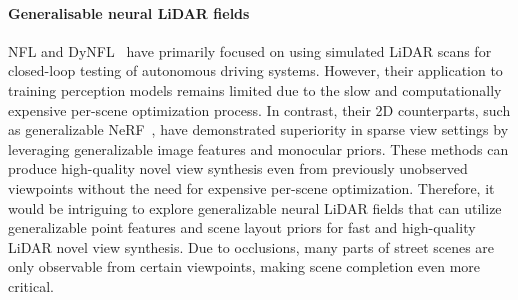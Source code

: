 \paragraph{Generalisable neural LiDAR fields}
NFL and DyNFL~\cite{Huang2023nfl,Wu2023dynfl} have primarily focused on using simulated LiDAR scans for closed-loop testing of autonomous driving systems. However, their application to training perception models remains limited due to the slow and computationally expensive per-scene optimization process. In contrast, their 2D counterparts, such as generalizable NeRF~\cite{yu2021pixelnerf,chen2021mvsnerf}, have demonstrated superiority in sparse view settings by leveraging generalizable image features and monocular priors. These methods can produce high-quality novel view synthesis even from previously unobserved viewpoints without the need for expensive per-scene optimization. Therefore, it would be intriguing to explore generalizable neural LiDAR fields that can utilize generalizable point features and scene layout priors for fast and high-quality LiDAR novel view synthesis. Due to occlusions, many parts of street scenes are only observable from certain viewpoints, making scene completion even more critical.